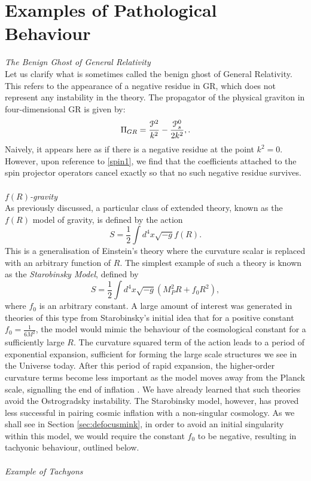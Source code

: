 \section{Examples of Pathological Behaviour}
\label{sec:patho}
\emph{The Benign Ghost of General Relativity}\\
Let us clarify what is sometimes called the benign ghost of General Relativity. This refers to the appearance of a negative residue in GR, which does not represent any instability in the theory. The propagator of the physical graviton in four-dimensional GR is given by:
\[
\Pi_{GR}=\frac{{\cal P}^2}{k^2}-\frac{{\cal P}^0_s}{2k^2},
.\]
Naively, it appears here as if there is a negative residue at the point $k^2=0$. However, upon reference to \eqref{spin1}, we find that the coefficients attached to the spin projector operators cancel exactly so that no such negative residue survives.
\\\\\emph{$f(R)$-gravity}\\
As previously discussed, a particular class of extended theory, known as the  $f(R)$ model of gravity, is defined by the action
\[
\label{fR}
S=\frac{1}{2}\int d^4 x \sqrt{-g} f(R)
.\]
This is a generalisation of Einstein's theory where the curvature scalar is replaced with an arbitrary function of $R$. The simplest example of such a theory is known as the \emph{Starobinsky Model}, defined by
\[
\label{starobinksymodel}
S=\frac{1}{2}\int d^4 x \sqrt{-g} \left(M_P^2R+f_0 R^2\right)
,\]
where $f_0$ is an arbitrary constant. A large amount of interest was generated in theories of this type from Starobinsky's initial idea that for a positive constant $f_0=\frac{1}{6 M^2}$, the model would mimic the behaviour of the cosmological constant for a sufficiently large $R$. The curvature squared term of the action leads to a period of exponential expansion, sufficient for forming the large scale structures we see in the Universe today. After this period of rapid expansion, the higher-order curvature terms become less important as the model moves away from the Planck scale, signalling the end of inflation \cite{Starobinsky:1979ty}. We have already learned that such theories avoid the Ostrogradsky instability. The Starobinsky model, however, has proved less successful in pairing cosmic inflation with a non-singular cosmology.  As we shall see in Section \ref{sec:defocusmink}, in order to avoid an initial singularity within this model, we would require the constant $f_0$ to be negative, resulting in tachyonic behaviour, outlined below. 
 \\\\ \emph{Example of Tachyons}\\
